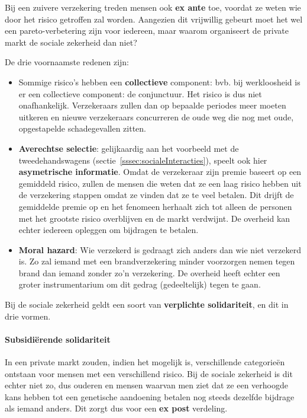 Bij een zuivere verzekering treden mensen ook \textbf{ex ante} toe, voordat ze weten wie door het risico getroffen zal worden. Aangezien dit vrijwillig gebeurt moet het wel een pareto-verbetering zijn voor iedereen, maar waarom organiseert de private markt de sociale zekerheid dan niet?

De drie voornaamste redenen zijn:
\begin{itemize}
   \item Sommige risico's hebben een \textbf{collectieve} component: bvb. bij werkloosheid is er een collectieve component: de conjunctuur. Het risico is dus niet onafhankelijk. Verzekeraars zullen dan op bepaalde periodes meer moeten uitkeren en nieuwe verzekeraars concurreren de oude weg die nog met oude, opgestapelde schadegevallen zitten.
   \item \textbf{Averechtse selectie}: gelijkaardig aan het voorbeeld met de tweedehandswagens (sectie~\ref{sssec:socialeInteracties}), speelt ook hier \textbf{asymetrische informatie}. Omdat de verzekeraar zijn premie baseert op een gemiddeld risico, zullen de mensen die weten dat ze een laag risico hebben uit de verzekering stappen omdat ze vinden dat ze te veel betalen. Dit drijft de gemiddelde premie op en het fenomeen herhaalt zich tot alleen de personen met het grootste risico overblijven en de markt verdwijnt. De overheid kan echter iedereen opleggen om bijdragen te betalen.
   \item \textbf{Moral hazard}: Wie verzekerd is gedraagt zich anders dan wie niet verzekerd is. Zo zal iemand met een brandverzekering minder voorzorgen nemen tegen brand dan iemand zonder zo'n verzekering. De overheid heeft echter een groter instrumentarium om dit gedrag (gedeeltelijk) tegen te gaan.
\end{itemize}

Bij de sociale zekerheid geldt een soort van \textbf{verplichte solidariteit}, en dit in drie vormen.

\paragraph{Subsidi\"erende solidariteit} In een private markt zouden, indien het mogelijk is, verschillende categorie\"en ontstaan voor mensen met een verschillend risico. Bij de sociale zekerheid is dit echter niet zo, dus ouderen en mensen waarvan men ziet dat ze een verhoogde kans hebben tot een genetische aandoening betalen nog steeds dezelfde bijdrage als iemand anders. Dit zorgt dus voor een \textbf{ex post} verdeling.

